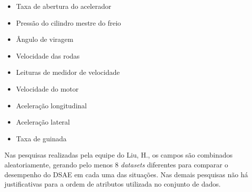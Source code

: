 \documentclass[10pt,journal,compsoc]{IEEEtran}
\begin{document}
\begin{itemize}
\item Taxa de abertura do acelerador
\item Pressão do cilindro mestre do freio
\item Ângulo de viragem
\item Velocidade das rodas
\item Leituras de medidor de velocidade
\item Velocidade do motor
\item Aceleração longitudinal
\item Aceleração lateral
\item Taxa de guinada
\end{itemize}
Nas pesquisas realizadas pela equipe do Liu, H., os
campos são combinados aleatoriamente, gerando pelo menos 8
\textit{datasets} diferentes para comparar o desempenho do
DSAE em cada uma das situações. Nas demais pesquisas não há justificativas para a ordem de
atributos utilizada no conjunto de dados.
\end{document}
